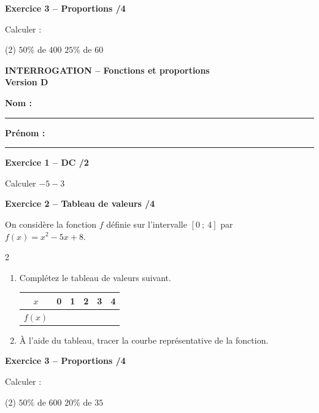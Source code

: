 \documentclass[10pt,a4paper]{article}
\newcommand{\version}[1]{
    \begin{center}
        \textbf{\large INTERROGATION -- Fonctions et proportions}\\
        \textbf{Version #1}
    \end{center}

    \vspace{-0.1cm}

    \textbf{Nom :} \rule{5cm}{0.4pt}
    \hfill
    \textbf{Prénom :} \rule{4cm}{0.4pt}

    \vspace{0.2cm}
}
\begin{document}
\textbf{Exercice 3 -- Proportions \hfill /4}

Calculer :\begin{tasks}(2)
\task $50\%$ de $400$
\task $25\%$ de $60$
\end{tasks}
\vfill


\version{D}

\textbf{Exercice 1 -- DC \hfill /2}

Calculer $-5-3$

\vspace{0.1cm}

\textbf{Exercice 2 -- Tableau de valeurs \hfill /4}

On considère la fonction \(f\) définie sur l'intervalle \([0\ ;\ 4]\) par \(f(x)=x^2-5x+8\). 


\begin{multicols}{2}
    \begin{minipage}{0.45\textwidth}
    \begin{enumerate}
    \item Complétez le tableau de valeurs suivant.
    
    \begin{center}
        \renewcommand{\arraystretch}{1.5} %
        \setlength{\tabcolsep}{0.3cm} %
        \begin{tabular}{|*{6}{c|}}
        \hline
        \(x\) & 0 & 1 & 2 & 3 & 4  \\
        \hline
        \(f(x)\) &  &  &  &  &  \\
        \hline
        \end{tabular}
    \end{center}

    \vfill\null
    
    \item À l'aide du tableau, tracer la courbe représentative de la fonction.
    \end{enumerate}
    \end{minipage}

        \hspace{-1cm}

\end{multicols}

\textbf{Exercice 3 -- Proportions \hfill /4}

Calculer :\begin{tasks}(2)
\task $50\%$ de $600$
\task $20\%$ de $35$
\end{tasks}
\end{document}
